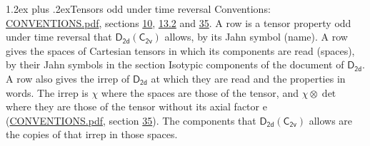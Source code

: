 \documentclass[10pt,a4paper]{article}
\makeatletter
\renewcommand\section{\@startsection{section}{1}{\z@}{-3ex plus -1ex minus -.2ex}%
  {1.2ex plus .2ex}{\normalfont\large\sffamily\bfseries\color{parttitle}}}
\numberwithin{equation}{section}
\newcommand{\grp}[1]{\mathsf{#1}}
\newcommand{\irrprod}{\otimes}
\makeatother
\begin{document}
\section{Tensors odd under time reversal}\label{s:time_odd}
Conventions: \href{../../CONVENTIONS.pdf}{CONVENTIONS.pdf}, sections \href{../../../rotation/CONVENTIONS.pdf\#conv.10}{10}, \href{../../../rotation/CONVENTIONS.pdf\#conv.13.2}{13.2} and \href{../../CONVENTIONS.pdf\#conv.35}{35}.
\leavevmode\label{n:head.name.property}A row is a tensor property odd under time reversal that $\grp{D_{2d}}(\grp{C_{2v}})$ allows, by its Jahn symbol (name). \label{n:head.spaces}A row gives the spaces of Cartesian tensors in which its components are read (spaces), by their Jahn symbols in the section Isotypic components of the document of \href{../../../rotation/data/pdf/D2d.pdf}{$\grp{D_{2d}}$}. \label{n:head.properties}A row also gives the irrep of $\grp{D_{2d}}$ at which they are read and the properties in words. The irrep is $\chi$ where the spaces are those of the tensor, and $\chi \irrprod \det$ where they are those of the tensor without its axial factor e (\href{../../CONVENTIONS.pdf}{CONVENTIONS.pdf}, section \href{../../CONVENTIONS.pdf\#conv.35}{35}). The components that $\grp{D_{2d}}(\grp{C_{2v}})$ allows are the copies of that irrep in those spaces.
\end{document}
